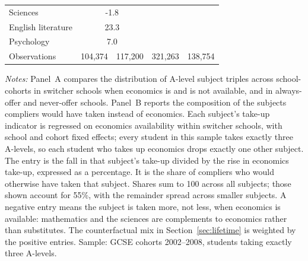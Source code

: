 \begin{table}[htbp]
\begin{tabular}{l cc cc}
Sciences                          & \multicolumn{2}{c}{-1.8}                &            &            \\
English literature                          & \multicolumn{2}{c}{23.3}                &            &            \\
Psychology                          & \multicolumn{2}{c}{7.0}                &            &            \\
\addlinespace
Observations                      & 104,374          & 117,200          & 321,263         & 138,754         \\
\bottomrule
\end{tabular}
\begin{minipage}{\textwidth}
\smallskip
\footnotesize
\textit{Notes:} Panel~A compares the distribution of A-level subject triples across school-cohorts in switcher schools when economics is and is not available, and in always-offer and never-offer schools. Panel~B reports the composition of the subjects compliers would have taken instead of economics. Each subject's take-up indicator is regressed on economics availability within switcher schools, with school and cohort fixed effects; every student in this sample takes exactly three A-levels, so each student who takes up economics drops exactly one other subject. The entry is the fall in that subject's take-up divided by the rise in economics take-up, expressed as a percentage. It is the share of compliers who would otherwise have taken that subject. Shares sum to 100 across all subjects; those shown account for 55\%, with the remainder spread across smaller subjects. A negative entry means the subject is taken more, not less, when economics is available: mathematics and the sciences are complements to economics rather than substitutes. The counterfactual mix in Section~\ref{sec:lifetime} is weighted by the positive entries. Sample: GCSE cohorts 2002--2008, students taking exactly three A-levels.
\end{minipage}
\end{table}
